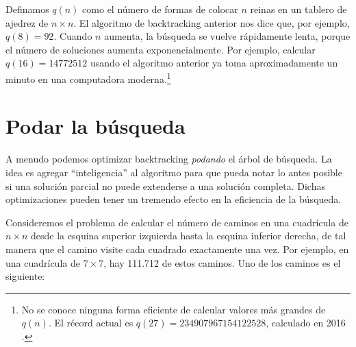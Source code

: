 \begin{center}
\end{center}

Definamos $q(n)$ como el número de formas de
colocar $n$ reinas en un tablero de ajedrez de $n \times n$.
El algoritmo de backtracking anterior nos dice que, por ejemplo, $q(8)=92$.
Cuando $n$ aumenta, la búsqueda se vuelve rápidamente lenta,
porque el número de soluciones aumenta
exponencialmente.
Por ejemplo, calcular $q(16)=14772512$
usando el algoritmo anterior ya toma aproximadamente un minuto
en una computadora moderna.\footnote{No se conoce ninguna forma eficiente de
    calcular valores más grandes de $q(n)$. El récord actual es
    $q(27)=234907967154122528$, calculado en 2016 \cite{q27}.}

\newpage
\section{Podar la búsqueda}

A menudo podemos optimizar backtracking \emph{podando} el árbol de búsqueda.
La idea es agregar ``inteligencia'' al algoritmo
para que pueda notar lo antes posible
si una solución parcial no puede extenderse
a una solución completa.
Dichas optimizaciones pueden tener un tremendo
efecto en la eficiencia de la búsqueda.

Consideremos el problema
de calcular el número de caminos
en una cuadrícula de $n \times n$ desde la esquina superior izquierda
hasta la esquina inferior derecha, de tal manera que
el camino visite cada cuadrado exactamente una vez.
Por ejemplo, en una cuadrícula de $7 \times 7$,
hay 111.712 de estos caminos.
Uno de los caminos es el siguiente:

\begin{center}
\end{center}


